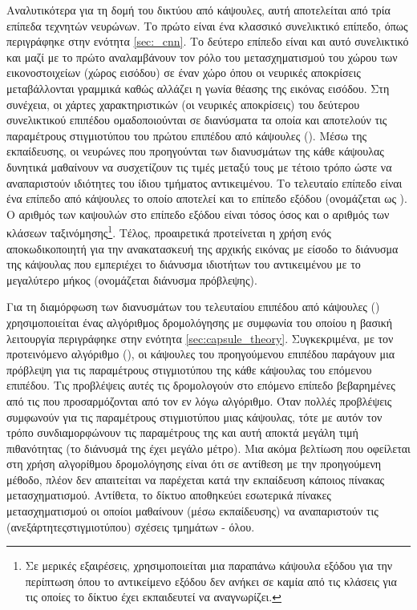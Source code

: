 Αναλυτικότερα για τη δομή του δικτύου από κάψουλες, αυτή αποτελείται από τρία επίπεδα τεχνητών νευρώνων. Το πρώτο είναι ένα κλασσικό συνελικτικό επίπεδο, όπως περιγράφηκε στην ενότητα \ref{sec:_cnn}. Το δεύτερο επίπεδο είναι και αυτό συνελικτικό και μαζί με το πρώτο αναλαμβάνουν τον ρόλο του μετασχηματισμού του χώρου των εικονοστοιχείων (χώρος εισόδου) σε έναν χώρο όπου οι νευρικές αποκρίσεις μεταβάλλονται γραμμικά καθώς αλλάζει η γωνία θέασης της εικόνας εισόδου. Στη συνέχεια, οι χάρτες χαρακτηριστικών (οι νευρικές αποκρίσεις) του δεύτερου συνελικτικού επιπέδου ομαδοποιούνται σε διανύσματα τα οποία και αποτελούν τις παραμέτρους στιγμιοτύπου του πρώτου επιπέδου από κάψουλες (). Μέσω της εκπαί\-δευσης, οι νευρώνες που προηγούνται των διανυσμάτων της κάθε κάψουλας δυνητικά μαθαίνουν να συσχετίζουν τις τιμές μεταξύ τους με τέτοιο τρόπο ώστε να αναπαριστούν ιδιότητες του ίδιου τμήματος αντικειμένου. Το τελευταίο επίπεδο είναι ένα επίπεδο από κάψουλες το οποίο αποτελεί και το επίπεδο εξόδου (ονομάζεται ως ). Ο αριθμός των καψουλών στο επίπεδο εξόδου είναι τόσος όσος και ο αριθμός των κλάσεων ταξινόμησης\footnote{Σε μερικές εξαιρέσεις, χρησιμοποιείται μια παραπάνω κάψουλα εξόδου για την περίπτωση όπου το αντικείμενο εξόδου δεν ανήκει σε καμία από τις κλάσεις για τις οποίες το δίκτυο έχει εκπαιδευτεί να αναγνωρίζει.}. Τέλος, προαιρετικά προτείνεται η χρήση ενός αποκωδικοποιητή για την ανακατασκευή της αρχικής εικόνας με είσοδο το διάνυσμα της κάψουλας που εμπεριέχει το διάνυσμα ιδιοτήτων του αντικειμένου με το μεγαλύτερο μήκος (ονομάζεται διάνυσμα πρόβλεψης).\par

Για τη διαμόρφωση των διανυσμάτων του τελευταίου επιπέδου από κάψουλες () χρησιμοποιείται ένας αλγόριθμος δρομολόγησης με συμφωνία του οποίου η βασική λειτουργία περιγράφηκε στην ενότητα \ref{sec:capsule_theory}. Συγκεκριμένα, με τον προτεινόμενο αλγόριθμο  (), οι κάψουλες του προηγούμενου επιπέδου παράγουν μια πρόβλεψη για τις παραμέτρους στιγμιοτύπου της κάθε κάψουλας του επόμενου επιπέδου. Τις προβλέψεις αυτές τις δρομολογούν στο επόμενο επίπεδο βεβαρημένες από τις  που προσαρμόζονται από τον εν λόγω αλγόριθμο. Όταν πολλές προβλέψεις συμφωνούν για τις παραμέτρους στιγμιοτύπου μιας κάψουλας, τότε με αυτόν τον τρόπο συνδιαμορφώνουν τις παραμέτρους της και αυτή αποκτά μεγάλη τιμή πιθανότητας (το διάνυσμά της έχει μεγάλο μέτρο). Μια ακόμα βελτίωση που οφείλεται στη χρήση αλγορίθμου δρομολόγησης είναι ότι σε αντίθεση με την προηγούμενη μέθοδο, πλέον δεν απαιτείται να παρέχεται κατά την εκπαίδευση κάποιος πίνακας μετασχηματισμού. Αντίθετα, το δίκτυο αποθηκεύει εσωτερικά πίνακες μετασχηματισμού οι οποίοι μαθαίνουν (μέσω εκπαίδευσης) να αναπαριστούν τις (ανεξάρτητες\textendash στιγμιοτύπου) σχέσεις τμημάτων - όλου.\par

